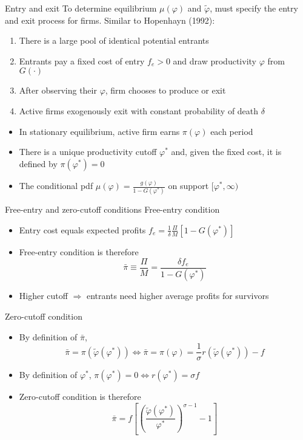 \documentclass[10pt,notes=hide]{beamer}
\begin{document}
\begin{frame}{Entry and exit}
To determine equilibrium $\mu(\varphi)$ and $\tilde{\varphi}$, must specify the entry and exit process for firms. 
Similar to Hopenhayn (1992):
\begin{enumerate}
\item There is a large pool of identical potential entrants
\item Entrants pay a fixed cost of entry $f_e>0$ and draw productivity $\varphi$ from $G(\cdot)$
\item After observing their $\varphi$, firm chooses to produce or exit
\item Active firms exogenously exit with constant probability of death $\delta$
\end{enumerate}
\begin{itemize}
	\item In stationary equilibrium, active firm earns $\pi(\varphi)$ each period
	\item There is a unique productivity cutoff $\varphi^*$ and, given the fixed cost, it is defined by $\pi(\varphi^*)=0$
	\item The conditional pdf $\mu(\varphi) = \frac{g(\varphi)}{1-G(\varphi^*)}$ on support $[\varphi^*,\infty)$
\end{itemize}
\end{frame}
\begin{frame}{Free-entry and zero-cutoff conditions}
Free-entry condition
\begin{itemize}
\item Entry cost equals expected profits $f_e = \frac{1}{\delta} \frac{\Pi}{M} \left[1-G(\varphi^*)\right] $
\item Free-entry condition is therefore
$$ \bar{\pi} \equiv \frac{\Pi}{M} = \frac{\delta f_e}{1-G(\varphi^*)}$$
\item Higher cutoff $\Rightarrow$ entrants need higher average profits for survivors
\end{itemize}
Zero-cutoff condition
\begin{itemize}
	\item By definition of $\bar{\pi}$,
	$$ \bar{\pi} = \pi(\tilde{\varphi}(\varphi^*)) \iff 
	\bar{\pi} = 
	\pi(\varphi) = \frac{1}{\sigma} r(\tilde{\varphi}(\varphi^*)) - f
	$$
	\item By definition of $\varphi^*$,
	$ \pi(\varphi^*)=0 \iff r(\varphi^*) = \sigma f $
	\item Zero-cutoff condition is therefore
	$$ \bar{\pi} = f \left[\left(\frac{\tilde{\varphi}(\varphi^*)}{\varphi^*}\right)^{\sigma-1} - 1\right] $$
\end{itemize}
\end{frame}
\end{document}
